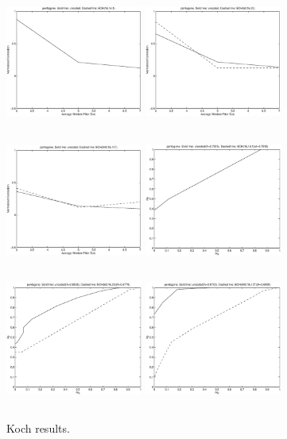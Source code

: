 \documentclass[12pt]{article}
\begin{document}
\begin{figure}[p]
        \includegraphics[height=4.5cm,width=4.5cm]{plot31.eps}
        \includegraphics[height=4.5cm,width=4.5cm]{plot35.eps}
        \includegraphics[height=4.5cm,width=4.5cm]{plot39.eps}
        \includegraphics[height=4.5cm,width=4.5cm]{plot32.eps}
        \includegraphics[height=4.5cm,width=4.5cm]{plot36.eps}
        \includegraphics[height=4.5cm,width=4.5cm]{plot40.eps}
        \caption{Koch results.}
\end{figure}
\end{document}
